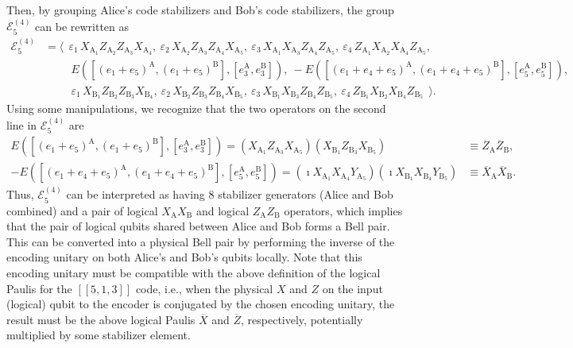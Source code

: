 \documentclass[journal,onecolumn]{IEEEtran}
\newcommand{\llbr}{[\![}
\newcommand{\rrbr}{]\!]}
\begin{document}
Then, by grouping Alice's code stabilizers and Bob's code stabilizers, the group $\mathcal{E}_5^{(4)}$ can be rewritten as
\begin{align}
\mathcal{E}_5^{(4)} & = \langle \ \ \varepsilon_1 \, X_{\text{A}_1} Z_{\text{A}_2} Z_{\text{A}_3} X_{\text{A}_4} , \ \varepsilon_2 \,  X_{\text{A}_2} Z_{\text{A}_3} Z_{\text{A}_4} X_{\text{A}_5} , \ \varepsilon_3 \, X_{\text{A}_1} X_{\text{A}_3} Z_{\text{A}_4} Z_{\text{A}_5} , \ \varepsilon_4 \, Z_{\text{A}_1} X_{\text{A}_2} X_{\text{A}_4} Z_{\text{A}_5} , \nonumber \\
%
 & \hspace{1cm} E([(e_1+e_5)^{\text{A}}, (e_1+e_5)^{\text{B}}],[e_3^{\text{A}}, e_3^{\text{B}}]) , \ -E([(e_1+e_4+e_5)^{\text{A}}, (e_1+e_4+e_5)^{\text{B}}], [e_5^{\text{A}}, e_5^{\text{B}}]) , \nonumber \\
%
  & \hspace{1cm} \varepsilon_1 \, X_{\text{B}_1} Z_{\text{B}_2} Z_{\text{B}_3} X_{\text{B}_4} , \ \varepsilon_2 \, X_{\text{B}_2} Z_{\text{B}_3} Z_{\text{B}_4} X_{\text{B}_5} , \ \varepsilon_3 \, X_{\text{B}_1} X_{\text{B}_3} Z_{\text{B}_4} Z_{\text{B}_5}, \ \varepsilon_4 \, Z_{\text{B}_1} X_{\text{B}_2} X_{\text{B}_4} Z_{\text{B}_5} \ \  \rangle.
\end{align}
Using some manipulations, we recognize that the two %
operators on the second line in $\mathcal{E}_5^{(4)}$ are
\begin{align}
E([(e_1+e_5)^{\text{A}}, (e_1+e_5)^{\text{B}}],[e_3^{\text{A}}, e_3^{\text{B}}]) = (X_{\text{A}_1} Z_{\text{A}_3} X_{\text{A}_5}) (X_{\text{B}_1} Z_{\text{B}_3} X_{\text{B}_5}) & \equiv \overline{Z}_{\text{A}} \overline{Z}_{\text{B}}, \nonumber \\
%
-E([(e_1+e_4+e_5)^{\text{A}}, (e_1+e_4+e_5)^{\text{B}}], [e_5^{\text{A}}, e_5^{\text{B}}]) = (\imath X_{\text{A}_1} X_{\text{A}_4} Y_{\text{A}_5}) (\imath X_{\text{B}_1} X_{\text{B}_4} Y_{\text{B}_5}) & \equiv \overline{X}_{\text{A}} \overline{X}_{\text{B}}.
\end{align}
Thus, $\mathcal{E}_5^{(4)}$ can be interpreted as having $8$ stabilizer generators (Alice and Bob combined) and a pair of logical $X_{\text{A}} X_{\text{B}}$ and logical $Z_{\text{A}} Z_{\text{B}}$ operators, which implies that the pair of logical qubits shared between Alice and Bob forms a Bell pair. 
This can be converted into a physical Bell pair by performing the inverse of the encoding unitary on both Alice's and Bob's qubits locally. 
Note that this encoding unitary must be compatible with the above definition of the logical Paulis for the $\llbr 5,1,3 \rrbr$ code, i.e., when the physical $X$ and $Z$ on the input (logical) qubit to the encoder is conjugated by the chosen encoding unitary, the result must be the above logical Paulis $\overline{X}$ and $\overline{Z}$, respectively, potentially multiplied by some stabilizer element. 
\end{document}
